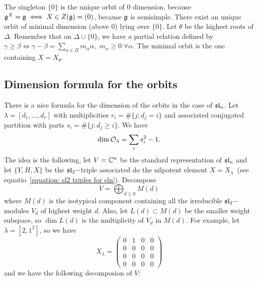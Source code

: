 The singleton $\{0\}$ is the unique orbit of 0 dimension, because $\mathfrak{g}^X=\mathfrak{g}\iff X\in Z(\mathfrak{g})=(0)$, because 
$\mathfrak{g}$ is semisimple. There exist an unique orbit of minimal dimension (above 0) lying over $\{0\}$. Let 
$\theta$ be the highest roots of $\Delta$. Remember that on $\Delta\cup\{0\}$, we have a partial relation defined by 
$\gamma\geq\beta\iff \gamma-\beta=\sum_{\alpha\in\Pi}m_\alpha\alpha,\;m_\alpha\geq0\;\forall\alpha$. The minimal orbit is 
the one containing $X=X_\theta$.


\subsection{Dimension formula for the orbits}
There is a nice formula for the dimension of the orbits in the case of $\mathfrak{sl}_n$. Let 
$\lambda = [d_1,\dots, d_r]$ with multiplicities $r_i = \#\{j:d_j=i\}$ and associated conjugated 
partition with parts $s_i = \#\{j:d_j\geq i\}$. We have 
\begin{equation}
    \dim \mathcal{O}_{\lambda} =  \sum_i s_i^2 - 1. 
\end{equation}
The idea is the following, let $V=\mathbb{C}^n$ be the standard representation of $\mathfrak{sl}_n$ and let 
$\{Y,H,X\}$ be the $\mathfrak{sl}_2-$triple associated do the nilpotent element $X=X_\lambda$~(see equatio~\ref{equation: sl2 triples for sln}). 
Decompose 
\begin{equation}
    V = \bigoplus_{d\geq0}M(d)
\end{equation}
where $M(d)$ is the isotypical component containing all the irreducible $\mathfrak{sl}_2-$modules $V_d$ of highest weight $d$. Also, let 
$L(d)\subset M(d)$ be the smaller weight subspace, so $\dim L(d)$ is the multiplicity of $V_d$ in $M(d)$. For example, 
let $\lambda = [2,1^2]$, so we have 
\begin{equation}
    X_\lambda = \begin{pmatrix}
        0&1&0&0\\
         0&0&0&0\\
          0&0&0&0\\
           0&0&0&0
    \end{pmatrix}
\end{equation}
and we have the following decomposion of $V$:
\begin{center}
\end{center}

